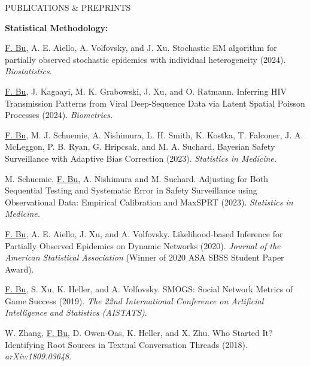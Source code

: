 \documentclass{resume} %
\newcommand{\myName}[1]{\underline{#1}}
\begin{document}


\begin{rSection}{PUBLICATIONS \& PREPRINTS}

\hspace{-.2in} \textbf{Statistical Methodology:}

\myName{F. Bu}, A. E. Aiello, A. Volfovsky, and J. Xu.  
Stochastic EM algorithm for partially observed stochastic epidemics with individual heterogeneity (2024).  \emph{Biostatistics}.%

\smallskip

\myName{F. Bu}, J. Kagaayi, M. K. Grabowski, J. Xu, and O. Ratmann.
Inferring HIV Transmission Patterns from Viral Deep-Sequence Data via Latent Spatial Poisson Processes (2024). \emph{Biometrics.} 

\smallskip

\myName{F. Bu}, M. J. Schuemie,  A. Nishimura, L. H. Smith, K. Kostka, T. Falconer, J. A. McLeggon, P. B. Ryan, G. Hripcsak, and M. A. Suchard.
Bayesian Safety Surveillance with Adaptive Bias Correction (2023). \emph{Statistics in Medicine.} %

\smallskip


M. Schuemie, \myName{F. Bu}, A. Nishimura and M. Suchard.
Adjusting for Both Sequential Testing and Systematic Error in Safety Surveillance using Observational Data: Empirical Calibration and MaxSPRT (2023). \emph{Statistics in Medicine.}

\smallskip


\myName{F. Bu}, A. E. Aiello, J. Xu, and A. Volfovsky. 
Likelihood-based Inference for Partially Observed Epidemics on Dynamic Networks (2020). \emph{Journal of the American Statistical Association} (Winner of 2020 ASA SBSS Student Paper Award). %

\smallskip

\myName{F. Bu}, S. Xu, K. Heller, and A. Volfovsky. 
SMOGS: Social Network Metrics of Game Success (2019). \emph{The 22nd International Conference on Artificial Intelligence and Statistics (AISTATS)}. %

\smallskip

W. Zhang, \myName{F. Bu}, D. Owen-Oas, K. Heller, and X. Zhu. 
Who Started It? Identifying Root Sources in Textual Conversation Threads (2018). \emph{arXiv:1809.03648}.

\medskip


\end{rSection}
\end{document}
